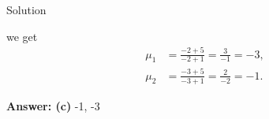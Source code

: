 \documentclass{beamer}
\begin{document}
\begin{frame}{Solution}


we get
\begin{align}
\mu_1 &= \frac{-2 + 5}{-2 + 1} = \frac{3}{-1} = -3, \\[4pt]
\mu_2 &= \frac{-3 + 5}{-3 + 1} = \frac{2}{-2} = -1.
\end{align}



\textbf{Answer: (c) } -1, -3


\end{frame}
\end{document}
